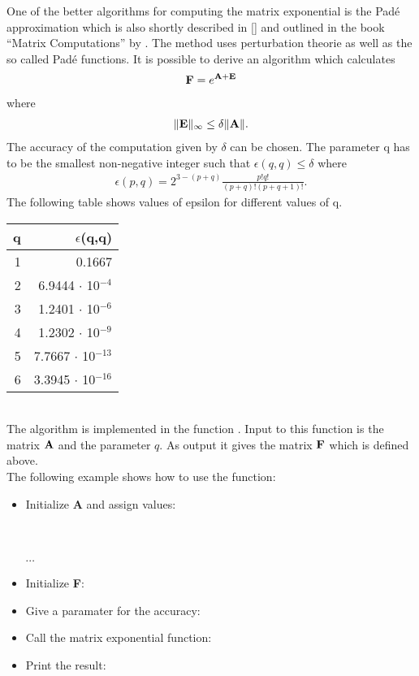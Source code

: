 One of the better algorithms for computing the matrix exponential is
the Pad\'e approximation which is also shortly described in
[\cite{Moler_Loan:79}] and outlined in the book ``Matrix
Computations'' by \cite{Golub_Loan:91}. 
The method uses perturbation theorie as well as the so called Pad\'e
functions. It is possible to derive an algorithm which calculates
\begin{eqnarray}
  {\bf F} = e^{{\bf A}+{\bf E}} 
\end{eqnarray}
where 
\begin{eqnarray}
  \|{\bf E}\|_\infty \le \delta \|{\bf A}\| .
\end{eqnarray}
The accuracy of the computation given by $\delta$ can be chosen. 
The parameter q has to be the smallest non-negative integer such that
$\epsilon(q,q)\le\delta$ where
\begin{eqnarray}
  \epsilon(p,q) = 2^{3-(p+q)}\frac{p!q!}{(p+q)!(p+q+1)!}.
\end{eqnarray}
The following table shows values of epsilon for
different values of q.
\vspace{0.5cm}\\
\begin{tabular}[h]{|r|r|}
 \hline
q & $\epsilon$(q,q) \\ \hline
1 & 0.1667\\
2 & 6.9444 $\cdot$ 10$^{-4}$ \\
3 & 1.2401 $\cdot$ 10$^{-6}$ \\
4 & 1.2302 $\cdot$ 10$^{-9}$ \\
5 & 7.7667 $\cdot$ 10$^{-13}$ \\
6 & 3.3945 $\cdot$ 10$^{-16}$ \\ 
\hline
\end{tabular}
\vspace{0.5cm}\\
The algorithm is implemented in the function . Input
to this function is the matrix ${\bf A}$ and the parameter $q$. As output
it gives the matrix ${\bf F}$ which is defined above.\\
The following example shows how to use the  function:
\begin{itemize}
\item Initialize {\bf A} and assign values:\\
  \\
  \\
  \\
$\cdots$ 
\item Initialize {\bf F}:\\
\item Give a paramater for the accuracy:\\
\item Call the matrix exponential function:\\
\item Print the result: \\
\end{itemize}






